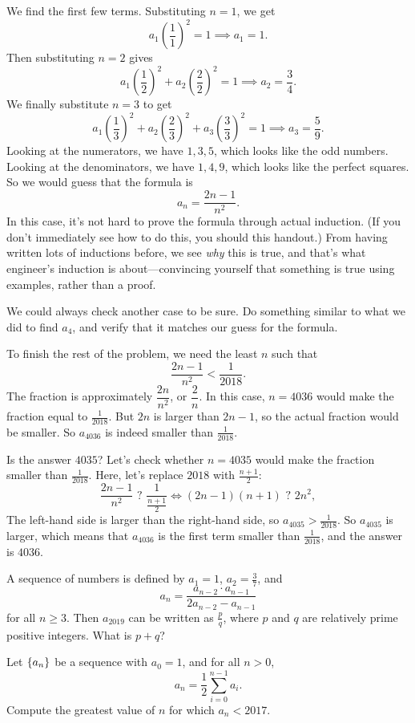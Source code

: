 \documentclass[11pt,paper=letter]{scrartcl}
\begin{document}
We find the first few terms. Substituting $n = 1$, we get
\[
  a_1\left(\frac{1}{1}\right)^2 = 1 \implies a_1 = 1.
\]
Then substituting $n = 2$ gives
\[
  a_1\left(\frac{1}{2}\right)^2 + a_2\left(\frac{2}{2}\right)^2 = 1 \implies a_2 = \frac{3}{4}.
\]
We finally substitute $n = 3$ to get
\[
  a_1\left(\frac{1}{3}\right)^2 + a_2\left(\frac{2}{3}\right)^2 + a_3\left(\frac{3}{3}\right)^2 = 1 \implies a_3 = \frac{5}{9}.
\]
Looking at the numerators, we have $1, 3, 5$, which looks like the odd numbers. Looking at the denominators, we have $1, 4, 9$, which looks like the perfect squares. So we would guess that the formula is
\[
  a_n = \frac{2n - 1}{n^2}.
\]
In this case, it's not hard to prove the formula through actual induction. (If you don't immediately see how to do this, you should  this handout.) From having written lots of inductions before, we see \emph{why} this is true, and that's what engineer's induction is about---convincing yourself that something is true using examples, rather than a proof.

\begin{exrboxed}
  We could always check another case to be sure. Do something similar to what we did to find $a_4$, and verify that it matches our guess for the formula.
\end{exrboxed}

To finish the rest of the problem, we need the least $n$ such that
\[
  \frac{2n-1}{n^2} < \frac{1}{2018}.
\]
The fraction is approximately $\dfrac{2n}{n^2}$, or $\dfrac{2}{n}$. In this case, $n = 4036$ would make the fraction equal to $\frac{1}{2018}$. But $2n$ is larger than $2n-1$, so the actual fraction would be smaller. So $a_{4036}$ is indeed smaller than $\frac{1}{2018}$.

Is the answer $4035$? Let's check whether $n = 4035$ would make the fraction smaller than $\frac{1}{2018}$. Here, let's  replace $2018$ with $\frac{n + 1}{2}$:
\[
  \frac{2n - 1}{n^2} \text{ ? } \frac{1}{\frac{n+1}{2}} \iff (2n-1)(n + 1) \text{ ? } 2n^2,
\]
The left-hand side is larger than the right-hand side, so $a_{4035} > \frac{1}{2018}$. So $a_{4035}$ is larger, which means that $a_{4036}$ is the first term smaller than $\frac{1}{2018}$, and the answer is $4036$.

\begin{mdframed}[style=exmdbox]
\begin{problem}[AMC 12A 2019/9]
A sequence of numbers is defined by $a_1 = 1$, $a_2 = \frac{3}{7}$, and $$a_n=\frac{a_{n-2} \cdot a_{n-1}}{2a_{n-2} - a_{n-1}}$$ for all $n \geq 3$. Then $a_{2019}$ can be written as $\frac{p}{q}$, where $p$ and $q$ are relatively prime positive integers. What is $p+q$?
\end{problem}

\begin{problem}
  Let $\left\{ a_n \right\}$ be a sequence with $a_0 = 1$, and for all $n > 0$, \[a_n = \frac12 \sum_{i=0}^{n-1}a_i.\] Compute the greatest value of $n$ for which $a_n < 2017$. \hint{\ref{h:2}}
\end{problem}

\end{mdframed}
\end{document}
